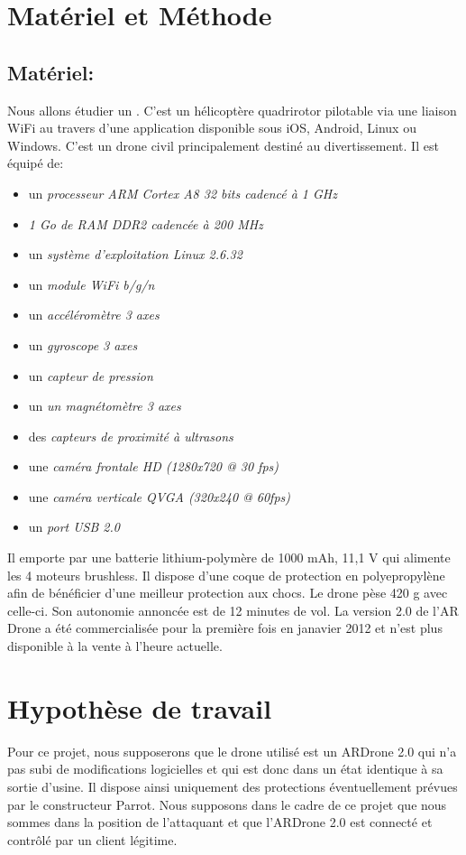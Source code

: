 \section{Matériel et Méthode}
\subsection{Matériel: }
Nous allons étudier un . C'est un hélicoptère quadrirotor pilotable via une liaison WiFi au travers d'une application disponible sous iOS, Android, Linux ou Windows. C'est un drone civil principalement destiné au divertissement. Il est équipé de:
\medbreak
\begin{itemize}
    \item un \textit{processeur ARM Cortex A8 32 bits cadencé à 1 GHz}
    \item \textit{1 Go de RAM DDR2 cadencée à 200 MHz}
    \item un \textit{système d'exploitation Linux 2.6.32}
    \item un \textit{module WiFi b/g/n}
    \item un \textit{accéléromètre 3 axes}
    \item un \textit{gyroscope 3 axes}
    \item un \textit{capteur de pression}
    \item un \textit{un magnétomètre 3 axes}
    \item des \textit{capteurs de proximité à ultrasons}
    \item une \textit{caméra frontale HD (1280x720 @ 30 fps)}
    \item une \textit{caméra verticale QVGA (320x240 @ 60fps)}
    \item un \textit{port USB 2.0}
\end{itemize}
\medbreak
Il emporte par une batterie lithium-polymère de 1000 mAh, 11,1 V qui alimente les 4 moteurs brushless. Il dispose d'une coque de protection en polyepropylène afin de bénéficier d'une meilleur protection aux chocs. Le drone pèse 420 g avec celle-ci. Son autonomie annoncée est de 12 minutes de vol. La version 2.0 de l'AR Drone a été commercialisée pour la première fois en janavier 2012 et n'est plus disponible à la vente à l'heure actuelle.


\section{Hypothèse de travail}
Pour ce projet, nous supposerons que le drone utilisé est un ARDrone 2.0 qui n'a pas subi de modifications logicielles et qui est donc dans un état identique à sa sortie d'usine. Il dispose ainsi uniquement des protections éventuellement prévues par le constructeur Parrot. Nous supposons dans le cadre de ce projet que nous sommes  dans la position de l'attaquant et que l'ARDrone 2.0 est connecté et contrôlé par un client légitime.
